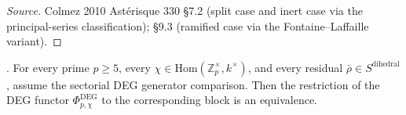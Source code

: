 \begin{proof}[Source]
Colmez 2010 Ast{\'e}risque 330 \S 7.2 (split case and inert case via
the principal-series classification); \S 9.3 (ramified case via the
Fontaine--Laffaille variant).
\end{proof}

\begin{theorem}
\label{v4-arith:w6-e:thm:TW-removal-dihedral}
\ClaimStatusNeedsVerification. For every prime \(p\geq 5\), every
\(\chi\in\mathrm{Hom}(\mathbb{Z}_{p}^{\times},k^{\times})\), and every
residual \(\bar\rho\in S^{\mathrm{dihedral}}\), assume the sectorial
DEG generator comparison. Then the restriction of
the DEG functor \(\Phi^{\mathrm{DEG}}_{p,\chi}\) to the corresponding
block is an equivalence.
\end{theorem}

